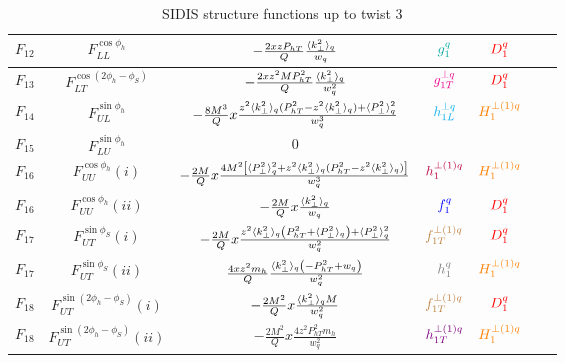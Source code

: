\documentclass[floatfix,aps,prd,nofootinbib,superscriptaddress,preprint]{revtex4}
\newcommand\3[1]{\boldsymbol{#1}}
\newcommand{\Phperp}{P_{hT}}
\begin{document}
\begin{table}[h!]
\begin{tabular}{|c|c|c|c|c|c|c|}
$F_{12}$ & $F_{LL}^{\cos\phi_h}$               & $-\frac{2xz\Phperp}{Q}\frac{\avk}{w_q}$                                                     & $\ppdf$         & ${\color{red} D_1^{q}}$           \\\hline
$F_{13}$ & $F_{LT}^{\cos(2\phi_h -\phi_S)}$    & $-\frac{2 x z^2 M \Phperp^2}{Q}\frac{\avk}{w_q^2}$                                          & ${\color{magenta} g^{\perp q}_{1T}}$          & ${\color{red} D_1^{q}}$           \\\hline
$F_{14}$ & $F_{UL}^{\sin\phi_h}$               & $-\frac{8M^3}{Q} x \frac{z^2\avk (\Phperp^2-z^2\avk)+\avp^2}{w_q^3}$                        & ${\color{cyan}h^{\perp q}_{1L}}$          & ${\color{orange} H^{\perp(1)q}_{1} }$      \\\hline
$F_{15}$ & $F_{LU}^{\sin\phi_h}$               & $0$                                                                                         &                 & \\\hline
$F_{16}$ & $F_{UU}^{\cos\phi_h}(i)$            & $-\frac{2M}{Q} x \frac{ 4 M^2 \left[\avp^2+z^2 \avk (\Phperp^2  -z^2\avk ) \right]}{w_q^3}$ & ${\color{purple} h^{\perp(1)q}_1 }$  & ${\color{orange} H^{\perp(1)q}_{1} }$      \\\hline
$F_{16}$ & $F_{UU}^{\cos\phi_h}(ii)$           & $-\frac{2M}{Q} x\frac{\langle k_{\perp}^2\rangle_q}{w_q}$                                                           & ${\color{blue} f_1^q}$          & ${\color{red} D_1^{q}} $          \\\hline
$F_{17}$ & $F_{UT}^{\sin\phi_S}(i)$            & $-\frac{2M}{Q} x \frac{z^2\avk \left(\Phperp^2+\avp\right) + \avp^2}{w_q^2}$                & ${\color{brown} f^{\perp(1)q}_{1T}}$       & ${\color{red} D_1^{q}}$           \\\hline
$F_{17}$ & $F_{UT}^{\sin\phi_S}(ii)$           & $\frac{4 x z^2 m_h}{Q}\frac{\avk\left(-\Phperp^2+w_q\right)}{w_q^2} $                       & $\transversity$ & ${\color{orange} H^{\perp(1)q}_{1} }$      \\\hline
$F_{18}$ & $F_{UT}^{\sin(2\phi_h-\phi_S)}(i)$  & $-\frac{2M^2}{Q} x \frac{\langle k_{\perp}^2\rangle_q M}{w_q^2} $                                                   & ${\color{brown} f^{\perp(1)q}_{1T}}$       & ${\color{red} D_1^{q}}$           \\\hline
$F_{18}$ & $F_{UT}^{\sin(2\phi_h-\phi_S)}(ii)$ & $-\frac{2M^2}{Q} x \frac{4z^2 \Phperp^2 m_h}{w_q^2}$                                        & ${\color{violet} h^{\perp(1)q}_{1T} }$ & ${\color{orange} H^{\perp(1)q}_{1} }$      \\\hline
\end{tabular}
\caption{SIDIS structure functions up to twist 3}
\label{t.chi2}
\end{table}
\end{document}
